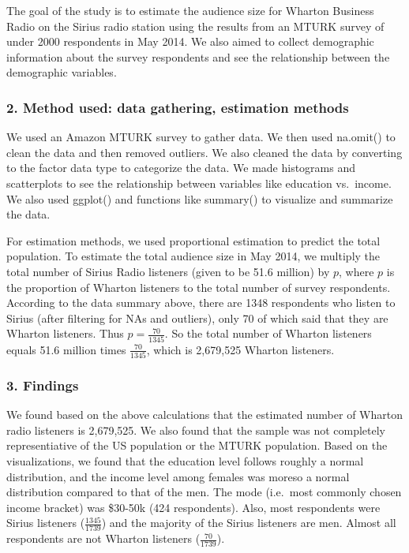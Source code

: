 \documentclass[
]{article}
\begin{document}
The goal of the study is to estimate the audience size for Wharton
Business Radio on the Sirius radio station using the results from an
MTURK survey of under 2000 respondents in May 2014. We also aimed to
collect demographic information about the survey respondents and see the
relationship between the demographic variables.

\hypertarget{method-used-data-gathering-estimation-methods}{%
\subsubsection{2. Method used: data gathering, estimation
methods}\label{method-used-data-gathering-estimation-methods}}

We used an Amazon MTURK survey to gather data. We then used na.omit() to
clean the data and then removed outliers. We also cleaned the data by
converting to the factor data type to categorize the data. We made
histograms and scatterplots to see the relationship between variables
like education vs.~income. We also used ggplot() and functions like
summary() to visualize and summarize the data.

For estimation methods, we used proportional estimation to predict the
total population. To estimate the total audience size in May 2014, we
multiply the total number of Sirius Radio listeners (given to be 51.6
million) by \(p\), where \(p\) is the proportion of Wharton listeners to
the total number of survey respondents. According to the data summary
above, there are 1348 respondents who listen to Sirius (after filtering
for NAs and outliers), only 70 of which said that they are Wharton
listeners. Thus \(p=\frac{70}{1345}\). So the total number of Wharton
listeners equals 51.6 million times \(\frac{70}{1345}\), which is
2,679,525 Wharton listeners.

\hypertarget{findings}{%
\subsubsection{3. Findings}\label{findings}}

We found based on the above calculations that the estimated number of
Wharton radio listeners is 2,679,525. We also found that the sample was
not completely representiative of the US population or the MTURK
population. Based on the visualizations, we found that the education
level follows roughly a normal distribution, and the income level among
females was moreso a normal distribution compared to that of the men.
The mode (i.e.~most commonly chosen income bracket) was \$30-50k (424
respondents). Also, most respondents were Sirius listeners
(\(\frac{1345}{1739}\)) and the majority of the Sirius listeners are
men. Almost all respondents are not Wharton listeners
(\(\frac{70}{1739}\)).
\end{document}
